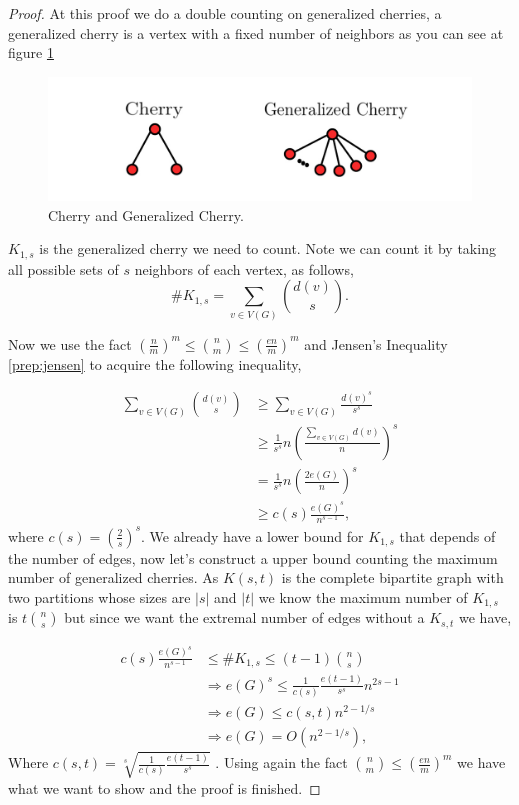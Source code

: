 \documentclass[12pt,twoside,a4paper]{book}
\numberwithin{equation}{section}
\theoremstyle{remark}
\begin{document}
\begin{proof}

At this proof we do a double counting on generalized cherries, a generalized cherry is a vertex with a fixed number of neighbors as you can see at figure \ref{fig:generalizedcherry}

\begin{figure}[!htb]
     \centering
     \includegraphics[scale=1]{Figuras/generalized-cherry.jpg}
     \caption{Cherry and Generalized Cherry.}
     \label{fig:generalizedcherry}
\end{figure}

$K_{1,s}$ is the generalized cherry we need to count. Note we can count it by taking all possible sets of $s$ neighbors of each vertex, as follows,
$$ \# K_{1,s} = \sum_{v \in V(G)} \binom{d(v)}{s} .$$

Now we use the fact $\left(\frac{n}{m}\right)^m \leq \binom{n}{m} \leq \left(\frac{en}{m}\right)^m$ and Jensen's Inequality \ref{prep:jensen} to acquire the following inequality,

\begin{align*} 
\sum_{v \in V(G)} \binom{d(v)}{s} & \geq \sum_{v \in V(G)}\frac{d(v)^s}{s^s}\\ 
& \geq \frac{1}{s^s} n \left( \frac{\sum_{v \in V(G)} d(v)}{n} \right) ^s \\
& = \frac{1}{s^s} n \left( \frac{ 2 e(G)}{n} \right) ^s \\
& \geq c(s) \frac{e(G)^s}{n^{s-1}},
\end{align*}
where $c(s) = \left(\frac{2}{s}\right)^s$.
We already have a lower bound for $K_{1,s}$ that depends of the number of edges, now let's construct a upper bound counting the maximum number of generalized cherries.
As $K(s,t)$ is the complete bipartite graph with two partitions whose sizes are $|s|$ and $|t|$ we know the maximum number of $K_{1,s}$ is $t\binom{n}{s}$ but since we want the extremal number of edges without a $K_{s,t}$ we have,

\begin{align*}
c(s) \frac{e(G)^s}{n^{s-1}} &\leq \# K_{1,s} \leq (t-1) \binom{n}{s}\\
		       & \Rightarrow e(G)^s \leq \frac{1}{c(s)}\frac{e(t-1)}{s^s}n^{2s-1}\\
		       &\Rightarrow e(G) \leq c(s,t) n^{2-1/s}\\
		       &\Rightarrow e(G) = O(n^{2-1/s}),
\end{align*}
Where $c(s,t)= \sqrt[s]{\frac{1}{c(s)}\frac{e(t-1)}{s^s}}$ . Using again the fact $\binom{n}{m} \leq \left(\frac{en}{m}\right)^m$ we have what we want to show and the proof is finished.
\end{proof}
\end{document}
